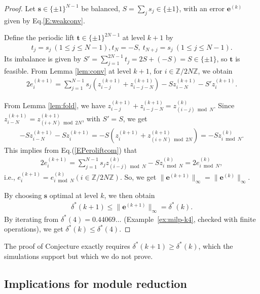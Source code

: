 \documentclass[11pt,a4paper]{article}
\theoremstyle{plain}
\theoremstyle{definition}
\theoremstyle{remark}
\newcommand{\Z}{\mathbb{Z}}
\begin{document}
\begin{proof}
Let $\mathbf{s}\in\{\pm1\}^{N-1}$ be balanced, $S=\sum_j s_j\in\{\pm1\}$, with an error $\mathbf{e}^{(k)}$ given by Eq.\eqref{E:weakconv}.

Define the periodic lift $\mathbf{t}\in\{\pm1\}^{2N-1}$ at level $k+1$ by
\begin{align}
  t_j=s_j\ (1\le j\le N-1), t_N=-S, \ t_{N+j}=s_j\ (1\le j\le N-1).
\label{EPerolift}
\end{align}
Its imbalance is given by $S'=\sum_{j=1}^{2N-1}t_j=2S+(-S)=S\in\{\pm1\}$, so $\mathbf{t}$ is feasible. From Lemma \ref{lem:conv} at level $k+1$, for $i\in\Z/2N\Z$, we obtain 
\begin{align}
  2e^{(k+1)}_i=\sum_{j=1}^{N-1}s_j(z^{(k+1)}_{i-j}+z^{(k+1)}_{i-j-N})   -S z^{(k+1)}_{i-N}-S' z^{(k+1)}_i.
\label{EPeroliftcom}
\end{align}

From Lemma \ref{lem:fold}, we have $z^{(k+1)}_{i-j}+z^{(k+1)}_{i-j-N}=z^{(k)}_{(i-j)\bmod N}$. Since $z^{(k+1)}_{i-N}=z^{(k+1)}_{(i+N)\bmod 2N}$, with $S'=S$, we get 
\begin{align}
  -S z^{(k+1)}_{i-N}-S z^{(k+1)}_i=-S (z^{(k+1)}_i+z^{(k+1)}_{(i+N)\bmod 2N})
  =-S z^{(k)}_{i\bmod N}.
\label{Ecoret}
\end{align}
This implies from Eq.(\ref{EPeroliftcom}) that 
\begin{align}
2e^{(k+1)}_i=\sum_{j=1}^{N-1}s_j z^{(k)}_{(i-j)\bmod N}-S z^{(k)}_{i\bmod N}=2e^{(k)}_{i\bmod N}, 
\label{EPeroliftcome1}
\end{align}
i.e., $e^{(k+1)}_i=e^{(k)}_{i\bmod N}(i\in\Z/2N\Z)$. So, we get $\|\mathbf{e}^{(k+1)}\|_\infty=\|\mathbf{e}^{(k)}\|_\infty$. 

By choosing $\mathbf{s}$ optimal at level $k$, we then obtain 
\begin{align}
\delta^*(k+1)\le\|\mathbf e^{(k+1)}\|_\infty=\delta^*(k).
\label{Edeltelift}
\end{align}
By iterating from $\delta^*(4)=0.44069\ldots$ (Example~\ref{ex:milp-k4}, checked with finite operations), we get $\delta^*(k)\le\delta^*(4)$.
\end{proof}

The proof of Conjecture exactly requires $\delta^*(k+1)\ge\delta^*(k)$, which the simulations support but which we do not prove.

\subsection{Implications for module reduction}\label{subsec:milp-implications}
\end{document}
